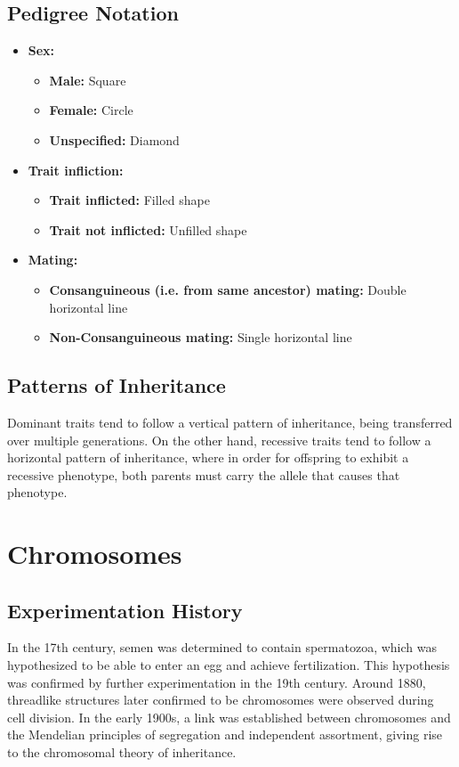 \documentclass[12pt,titlepage]{article}
\begin{document}
    \subsection{Pedigree Notation}
      \begin{itemize}
        \item \textbf{Sex:}
        \begin{itemize}
          \item \textbf{Male:} Square
          \item \textbf{Female:} Circle
          \item \textbf{Unspecified:} Diamond
        \end{itemize}

        \item \textbf{Trait infliction:}
          \begin{itemize}
            \item \textbf{Trait inflicted:} Filled shape
            \item \textbf{Trait not inflicted:} Unfilled shape
          \end{itemize}

        \item \textbf{Mating:}
          \begin{itemize}
            \item \textbf{Consanguineous (i.e. from same ancestor) mating:} Double horizontal line
            \item \textbf{Non-Consanguineous mating:} Single horizontal line
          \end{itemize}
      \end{itemize}

    \subsection{Patterns of Inheritance}
      Dominant traits tend to follow a vertical pattern of inheritance, being transferred over multiple generations. On the other hand,
      recessive traits tend to follow a horizontal pattern of inheritance, where in order for offspring to exhibit a recessive phenotype,
      both parents must carry the allele that causes that phenotype.

  \newpage

  \section{Chromosomes}
    \subsection{Experimentation History}
      In the 17th century, semen was determined to contain spermatozoa, which was hypothesized to be able to enter an egg and achieve fertilization.
      This hypothesis was confirmed by further experimentation in the 19th century. Around 1880, threadlike structures later confirmed to be
      chromosomes were observed during cell division. In the early 1900s, a link was established between chromosomes and the Mendelian principles of
      segregation and independent assortment, giving rise to the chromosomal theory of inheritance.
\end{document}
